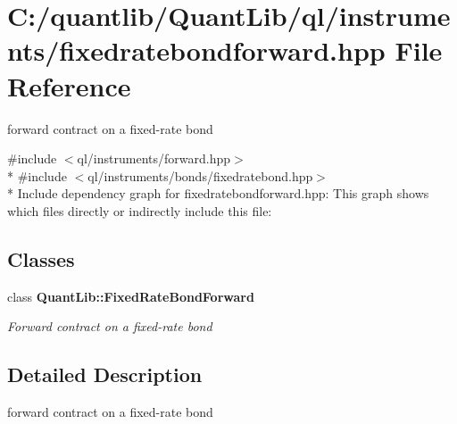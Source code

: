 \section{C\+:/quantlib/\+Quant\+Lib/ql/instruments/fixedratebondforward.hpp File Reference}
\label{fixedratebondforward_8hpp}


forward contract on a fixed-\/rate bond  


{\ttfamily \#include $<$ql/instruments/forward.\+hpp$>$}\\*
{\ttfamily \#include $<$ql/instruments/bonds/fixedratebond.\+hpp$>$}\\*
Include dependency graph for fixedratebondforward.\+hpp\+:
This graph shows which files directly or indirectly include this file\+:
\subsection*{Classes}
\begin{DoxyCompactItemize}
\item 
class {\bf Quant\+Lib\+::\+Fixed\+Rate\+Bond\+Forward}
\begin{DoxyCompactList}\small\item\em Forward contract on a fixed-\/rate bond \end{DoxyCompactList}\end{DoxyCompactItemize}


\subsection{Detailed Description}
forward contract on a fixed-\/rate bond 

